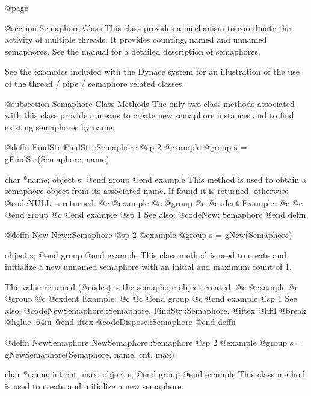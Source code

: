 @page

@section Semaphore Class
This class provides a mechanism to coordinate the activity of multiple
threads.  It provides counting, named and unnamed semaphores.
 See the manual for a detailed description of semaphores.


See the examples included with the Dynace system for an illustration of the
use of the thread / pipe / semaphore related classes.


@subsection Semaphore Class Methods
The only two class methods associated with this class provide a
means to create new semaphore instances and to find existing
semaphores by name.








@deffn {FindStr} FindStr::Semaphore
@sp 2
@example
@group
s = gFindStr(Semaphore, name)

char    *name;
object  s;
@end group
@end example
This method is used to obtain a semaphore object from its associated name.
If found it is returned, otherwise @code{NULL} is returned.  
@c @example
@c @group
@c @exdent Example:
@c 
@c @end group
@c @end example
@sp 1
See also:  @code{New::Semaphore}
@end deffn










@deffn {New} New::Semaphore
@sp 2
@example
@group
s = gNew(Semaphore)

object  s;
@end group
@end example
This class method is used to create and initialize a new unnamed semaphore
with an initial and maximum count of 1.

The value returned (@code{s}) is the semaphore object created.
@c @example
@c @group
@c @exdent Example:
@c 
@c @end group
@c @end example
@sp 1
See also:  @code{NewSemaphore::Semaphore, FindStr::Semaphore,}
@iftex
@hfil @break @hglue .64in      
@end iftex
@code{Dispose::Semaphore}
@end deffn













@deffn {NewSemaphore} NewSemaphore::Semaphore
@sp 2
@example
@group
s = gNewSemaphore(Semaphore, name, cnt, max)

char    *name;
int     cnt, max;
object  s;
@end group
@end example
This class method is used to create and initialize a new semaphore.

